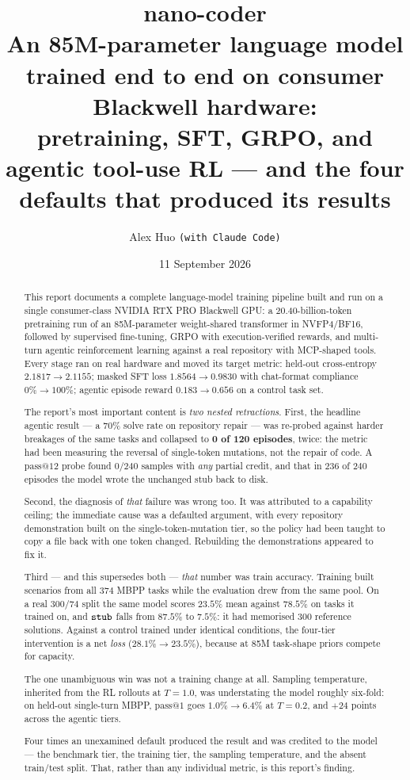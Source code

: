 \documentclass[10pt,a4paper]{article}
\title{\vspace{-1.2cm}\textbf{\color{ink}nano-coder}\\[2pt]
\large An 85M-parameter language model trained end to end on consumer Blackwell
hardware:\\ pretraining, SFT, GRPO, and agentic tool-use RL --- and the four
defaults that produced its results}
\author{Alex Huo \quad\small\texttt{(with Claude Code)}}
\date{11 September 2026}
\newcommand{\code}[1]{\texttt{\small #1}}
\begin{document}
\maketitle
\thispagestyle{empty}

\begin{abstract}
\noindent
This report documents a complete language-model training pipeline built and run
on a single consumer-class NVIDIA RTX PRO Blackwell GPU: a 20.40-billion-token
pretraining run of an 85M-parameter weight-shared transformer in NVFP4/BF16,
followed by supervised fine-tuning, GRPO with execution-verified rewards, and
multi-turn agentic reinforcement learning against a real repository with
MCP-shaped tools. Every stage ran on real hardware and moved its target metric:
held-out cross-entropy $2.1817 \rightarrow 2.1155$; masked SFT loss
$1.8564 \rightarrow 0.9830$ with chat-format compliance $0\% \rightarrow 100\%$;
agentic episode reward $0.183 \rightarrow 0.656$ on a control task set.

\medskip\noindent
The report's most important content is \emph{two nested retractions}. First, the
headline agentic result --- a $70\%$ solve rate on repository repair --- was
re-probed against harder breakages of the same tasks and collapsed to
\textbf{0 of 120 episodes}, twice: the metric had been measuring the reversal of
single-token mutations, not the repair of code. A $\mathrm{pass@}12$ probe found
$0/240$ samples with \emph{any} partial credit, and that in $236$ of $240$
episodes the model wrote the unchanged stub back to disk.

\medskip\noindent
Second, the diagnosis of \emph{that} failure was wrong too. It was attributed to
a capability ceiling; the immediate cause was a defaulted argument, with every
repository demonstration built on the single-token-mutation tier, so the policy
had been taught to copy a file back with one token changed. Rebuilding the
demonstrations appeared to fix it.

\medskip\noindent
Third --- and this supersedes both --- \emph{that} number was train accuracy.
Training built scenarios from all $374$ MBPP tasks while the evaluation drew
from the same pool. On a real $300/74$ split the same model scores $\mathbf{23.5\%}$
mean against $78.5\%$ on tasks it trained on, and $\code{stub}$ falls from
$87.5\%$ to $7.5\%$: it had memorised $300$ reference solutions. Against a
control trained under identical conditions, the four-tier intervention is a net
\emph{loss} ($28.1\% \rightarrow 23.5\%$), because at 85M task-shape priors
compete for capacity.

\medskip\noindent
The one unambiguous win was not a training change at all. Sampling temperature,
inherited from the RL rollouts at $T{=}1.0$, was understating the model roughly
six-fold: on held-out single-turn MBPP, $\mathrm{pass@}1$ goes
$1.0\% \rightarrow \mathbf{6.4\%}$ at $T{=}0.2$, and ${+}24$ points across the
agentic tiers.

\medskip\noindent
Four times an unexamined default produced the result and was credited to the
model --- the benchmark tier, the training tier, the sampling temperature, and
the absent train/test split. That, rather than any individual metric, is this
report's finding.
\end{abstract}
\end{document}
